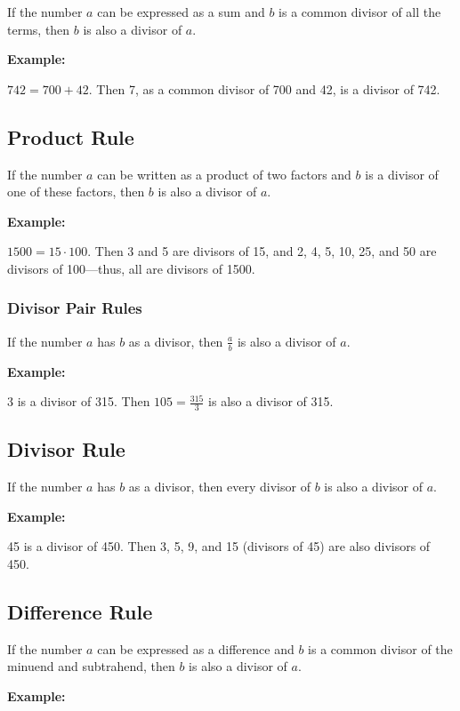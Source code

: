 If the number \(a\) can be expressed as a sum and \(b\) is a common divisor of all the terms, 
then \(b\) is also a divisor of \(a\).

\textbf{Example:} 

\( 742 = 700 + 42 \). Then 7, as a common divisor of 700 and 42, is a divisor of 742.

\subsection*{Product Rule}

If the number \(a\) can be written as a product of two factors and \(b\) is a divisor of one of these factors, then \(b\) is also a divisor of \(a\).

\textbf{Example:}

\( 1500 = 15 \cdot 100 \). Then 3 and 5 are divisors of 15, and 2, 4, 5, 10, 25, and 50 are divisors of 
100—thus, all are divisors of 1500.

\subsubsection*{Divisor Pair Rules}

If the number \(a\) has \(b\) as a divisor, then \( \frac{a}{b} \) is also a divisor of \(a\).

\textbf{Example:}

3 is a divisor of 315. Then \( 105 = \frac{315}{3} \) is also a divisor of 315.

\subsection*{Divisor Rule}

If the number \(a\) has \(b\) as a divisor, then every divisor of \(b\) is also a divisor of 
\(a\).

\textbf{Example:}

45 is a divisor of 450. Then 3, 5, 9, and 15 (divisors of 45) are also divisors of 450.

\subsection*{Difference Rule}

If the number \(a\) can be expressed as a difference and \(b\) is a common divisor of the minuend 
and subtrahend, then \(b\) is also a divisor of \(a\).

\textbf{Example:}


